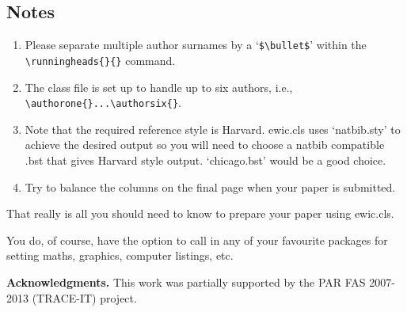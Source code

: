 \documentclass{ewic}
\begin{document}
\subsection{Notes}
\begin{enumerate}
\item Please separate multiple author surnames by a `\verb+$\bullet$+' within the
\verb+\runningheads{}{}+ command.

\item The class file is set up to handle up to six authors, i.e., \verb+\authorone{}...\authorsix{}+.

\item Note that the required reference style is Harvard. ewic.cls
uses `natbib.sty' to achieve the desired output so you will need
to choose a natbib compatible .bst that gives Harvard style
output. `chicago.bst' would be a good choice.

\item Try to balance the columns on the final page when your paper is submitted.
\end{enumerate}

That really is all you should need to know to prepare your paper
using ewic.cls.\citep{Mills2003}

You do, of course, have the option to call in any of your
favourite packages for setting maths, graphics, computer listings,
etc.

\textbf{Acknowledgments. }
This work was partially supported by the PAR FAS 2007-2013 (TRACE-IT) project.

%
%
%
%



\end{document}
